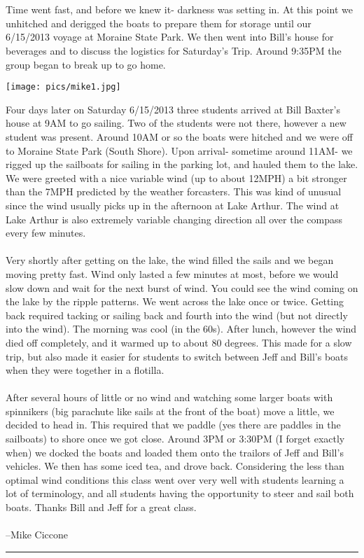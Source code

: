\documentclass[10pt,a4paper]{article}
\newenvironment{Figure}
  {\par\medskip\noindent\minipage{\linewidth}}
  {\endminipage\par\medskip}
\begin{document}
\begin{multicols}{2}
\\
\\
Time went fast, and before we knew it- darkness was setting in.  At this point we unhitched and derigged the boats to prepare them for storage until our 6/15/2013 voyage at Moraine State Park.  We then went into Bill's house for beverages and to discuss the logistics for Saturday's Trip.  Around 9:35PM the group began to break up to go home.
 
\begin{Figure}
 \centering
 \texttt{[image: pics/mike1.jpg]}
\end{Figure}
 
Four days later on Saturday 6/15/2013 three students arrived at Bill Baxter's house at 9AM to go sailing.  Two of the students were not there, however a new student was present.  Around 10AM or so the boats were hitched and we were off to Moraine State Park (South Shore).  Upon arrival- sometime around 11AM- we rigged up the sailboats for sailing in the parking lot, and hauled them to the lake.  We were greeted with a nice variable wind (up to about 12MPH) a bit stronger than the 7MPH predicted by the weather forcasters.  This was kind of unusual since the wind usually picks up in the afternoon at Lake Arthur.  The wind at Lake Arthur is also extremely variable changing direction all over the compass every few minutes. 
\\
\\
Very shortly after getting on the lake, the wind filled the sails and we began moving pretty fast.  Wind only lasted a few minutes at most, before we would slow down and wait for the next burst of wind.  You could see the wind coming on the lake by the ripple patterns.  We went across the lake once or twice. Getting back required tacking or sailing back and fourth into the wind (but not directly into the wind).  The morning was cool (in the 60s).  After lunch, however the wind died off completely, and it warmed up to about 80 degrees.  This made for a slow trip, but also made it easier for students to switch between Jeff and Bill's boats when they were together in a flotilla.  
\\
\\
After several hours of little or no wind and watching some larger boats with spinnikers (big parachute like sails at the front of the boat) move a little, we decided to head in.  This required that we paddle (yes there are paddles in the sailboats) to shore once we got close.  Around 3PM or 3:30PM (I forget exactly when) we docked the boats and loaded them onto the trailors of Jeff and Bill's vehicles.  We then has some iced tea, and drove back.  Considering the less than optimal wind conditions this class went over very well with students learning a lot of terminology, and all students having the opportunity to steer and sail both boats.  Thanks Bill and Jeff for a great class.
\\
\\
--Mike Ciccone
\hrule


\end{multicols}
\end{document}

